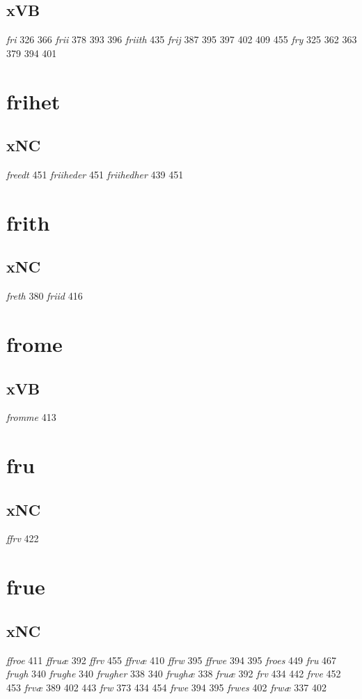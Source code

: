 \documentclass[a4paper,twocolumn]{article}
\begin{document}
\subsection{xVB}
\label{sec:org87530f1}
\emph{fri} 326 366 \emph{frii} 378 393 396 \emph{friith} 435 \emph{frij} 387 395 397 402 409 455 \emph{fry} 325 362 363 379 394 401 
\section{frihet}
\label{sec:org915c14e}
\subsection{xNC}
\label{sec:org336f04b}
\emph{freedt} 451 \emph{friiheder} 451 \emph{friihedher} 439 451 
\section{frith}
\label{sec:org0d8cd87}
\subsection{xNC}
\label{sec:orga45042a}
\emph{freth} 380 \emph{friid} 416 
\section{frome}
\label{sec:org9e4a7a6}
\subsection{xVB}
\label{sec:org042027e}
\emph{fromme} 413 
\section{fru}
\label{sec:orgc0e64a2}
\subsection{xNC}
\label{sec:orgaaa9278}
\emph{ffrv} 422 
\section{frue}
\label{sec:orge63145e}
\subsection{xNC}
\label{sec:orgf9c7961}
\emph{ffroe} 411 \emph{ffruæ} 392 \emph{ffrv} 455 \emph{ffrvæ} 410 \emph{ffrw} 395 \emph{ffrwe} 394 395 \emph{froes} 449 \emph{fru} 467 \emph{frugh} 340 \emph{frughe} 340 \emph{frugher} 338 340 \emph{frughæ} 338 \emph{fruæ} 392 \emph{frv} 434 442 \emph{frve} 452 453 \emph{frvæ} 389 402 443 \emph{frw} 373 434 454 \emph{frwe} 394 395 \emph{frwes} 402 \emph{frwæ} 337 402 
\end{document}

